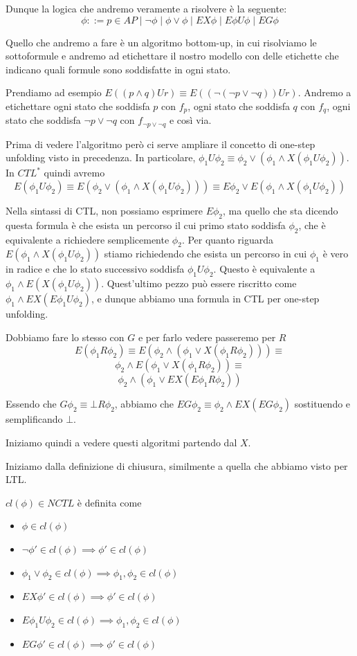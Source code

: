 Dunque la logica che andremo veramente a risolvere è la seguente:
\[\phi::= p \in AP \mid \neg \phi \mid \phi \lor \phi \mid EX \phi \mid E\phi U \phi \mid EG \phi\]

Quello che andremo a fare è un algoritmo bottom-up, in cui risolviamo le sottoformule e andremo ad etichettare il nostro modello con delle etichette che indicano quali formule sono soddisfatte in ogni stato.

Prendiamo ad esempio \(E((p\land q) U r)\equiv E((\neg(\neg p \lor \neg q))U r)\). Andremo a etichettare ogni stato che soddisfa \(p\) con \(f_p\), ogni stato che soddisfa \(q\) con \(f_q\), ogni stato che soddisfa \(\neg p \lor \neg q\) con \(f_{\neg p \lor \neg q}\) e così via.

Prima di vedere l'algoritmo però ci serve ampliare il concetto di one-step unfolding visto in precedenza.
In particolare, \(\phi_1 U \phi_2 \equiv \phi_2 \lor (\phi_1 \land X(\phi_1 U \phi_2))\). In \(CTL^*\) quindi avremo
\[E(\phi_1 U \phi_2 )\equiv E(\phi_2 \lor (\phi_1 \land X(\phi_1 U \phi_2))) \equiv E\phi_2 \lor E(\phi_1 \land X(\phi_1 U \phi_2))\]

Nella sintassi di CTL\@, non possiamo esprimere \(E \phi_2\), ma quello che sta dicendo questa formula è che esista un percorso il cui primo stato soddisfa \(\phi_2\), che è equivalente a richiedere semplicemente \(\phi_2\).
Per quanto riguarda \(E(\phi_1 \land X(\phi_1 U \phi_2))\) stiamo richiedendo che esista un percorso in cui \(\phi_1\) è vero in radice e che lo stato successivo soddisfa \(\phi_1 U \phi_2\). Questo è equivalente a \(\phi_1 \land E(X (\phi_1 U \phi_2))\).
Quest'ultimo pezzo può essere riscritto come \(\phi_1 \land EX (E \phi_1 U \phi_2)\), e dunque abbiamo una formula in CTL per one-step unfolding.

Dobbiamo fare lo stesso con \(G\) e per farlo vedere passeremo per \(R\)
\[E(\phi_1 R \phi_2) \equiv E(\phi_2 \land (\phi_1 \lor X(\phi_1 R \phi_2)))\equiv\]
\[\phi_2 \land E(\phi_1 \lor X(\phi_1 R \phi_2))\equiv\]
\[\phi_2 \land (\phi_1 \lor EX (E \phi_1 R \phi_2))\]

Essendo che \(G \phi_2 \equiv \bot R \phi_2\), abbiamo che \(EG \phi_2 \equiv \phi_2 \land EX (EG \phi_2)\) sostituendo e semplificando \(\bot\).

Iniziamo quindi a vedere questi algoritmi partendo dal \(X\).

Iniziamo dalla definizione di chiusura, similmente a quella che abbiamo visto per LTL.

\(cl(\phi) \in NCTL\) è definita come
\begin{itemize}
  \item \(\phi \in cl(\phi)\)
  \item \(\neg \phi' \in cl(\phi)\implies \phi' \in cl(\phi)\)
  \item \(\phi_1 \lor \phi_2 \in cl(\phi)\implies \phi_1, \phi_2 \in cl(\phi)\)
  \item \(EX \phi' \in cl(\phi)\implies \phi' \in cl(\phi)\)
  \item \(E\phi_1 U \phi_2 \in cl(\phi)\implies \phi_1, \phi_2 \in cl(\phi)\)
  \item \(EG \phi' \in cl(\phi)\implies \phi' \in cl(\phi)\)
\end{itemize}

